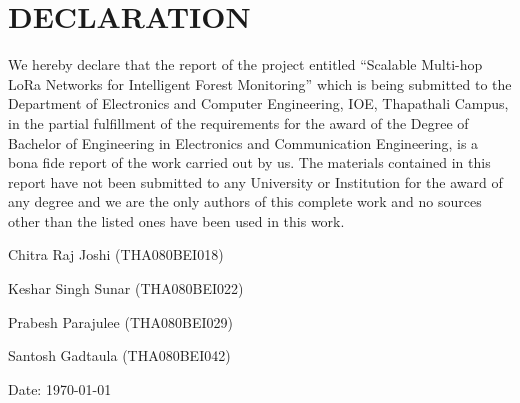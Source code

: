 
\chapter*{\centering \textbf{DECLARATION}}

We hereby declare that the report of the project entitled ``Scalable Multi-hop
LoRa Networks for Intelligent Forest Monitoring'' which is being submitted to
the Department of Electronics and Computer Engineering, IOE, Thapathali
Campus, in the partial fulfillment of the requirements for the award of the
Degree of Bachelor of Engineering in Electronics and Communication
Engineering, is a bona fide report of the work carried out by us. The materials
contained in this report have not been submitted to any University or
Institution for the award of any degree and we are the only authors of this
complete work and no sources other than the listed ones have been used in this
work.

\vspace{1cm}

Chitra Raj Joshi (THA080BEI018) \hrulefill

Keshar Singh Sunar (THA080BEI022) \hrulefill

Prabesh Parajulee (THA080BEI029) \hrulefill

Santosh Gadtaula (THA080BEI042) \hrulefill

\vspace{0.5cm}

Date: \monthyeardate\today

\clearpage